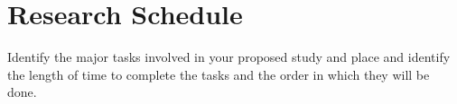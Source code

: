 \section{Research Schedule} \label{schedule}

Identify the major tasks involved in your proposed study and place and identify
the length of time to complete the tasks and the order in which they will be
done.
